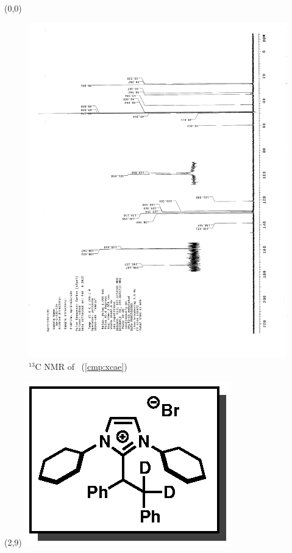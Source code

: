 \clearpage
\begin{textblock}{20}(0,0)
\begin{figure}[htb]
\caption{$^{13}$C NMR of  \CMPxcae\ (\ref{cmp:xcae})}
\includegraphics[scale=0.75, trim = 0mm 0mm 0mm 5mm,
clip]{chp_alkylation/images/nmr/xcaeC}
\vspace{-100pt}
\end{figure}
\end{textblock}
\begin{textblock}{1}(2,9)
\includegraphics[scale=0.8, angle=90]{chp_alkylation/images/xcae}
\end{textblock}
\clearpage

